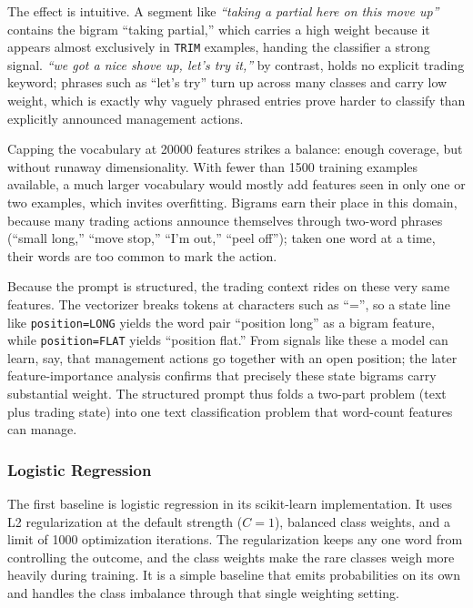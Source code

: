 The effect is intuitive. A segment like \textit{``taking a partial here on this move up''} contains the bigram ``taking partial,'' which carries a high weight because it appears almost exclusively in \texttt{TRIM} examples, handing the classifier a strong signal. \textit{``we got a nice shove up, let's try it,''} by contrast, holds no explicit trading keyword; phrases such as ``let's try'' turn up across many classes and carry low weight, which is exactly why vaguely phrased entries prove harder to classify than explicitly announced management actions.

Capping the vocabulary at 20000 features strikes a balance: enough coverage, but without runaway dimensionality. With fewer than 1500 training examples available, a much larger vocabulary would mostly add features seen in only one or two examples, which invites overfitting. Bigrams earn their place in this domain, because many trading actions announce themselves through two-word phrases (``small long,'' ``move stop,'' ``I'm out,'' ``peel off''); taken one word at a time, their words are too common to mark the action.

Because the prompt is structured, the trading context rides on these very same features. The vectorizer breaks tokens at characters such as ``='', so a state line like \texttt{position=LONG} yields the word pair ``position long'' as a bigram feature, while \texttt{position=FLAT} yields ``position flat.'' From signals like these a model can learn, say, that management actions go together with an open position; the later feature-importance analysis confirms that precisely these state bigrams carry substantial weight. The structured prompt thus folds a two-part problem (text plus trading state) into one text classification problem that word-count features can manage.

\subsubsection{Logistic Regression}

The first baseline is logistic regression in its scikit-learn implementation. It uses L2 regularization at the default strength ($C=1$), balanced class weights, and a limit of 1000 optimization iterations. The regularization keeps any one word from controlling the outcome, and the class weights make the rare classes weigh more heavily during training. It is a simple baseline that emits probabilities on its own and handles the class imbalance through that single weighting setting.

